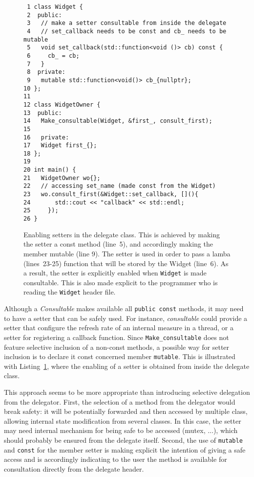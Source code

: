 \documentclass{article}
\begin{document}
\begin{figure}[ht]
{\small
\begin{lstlisting}
 1 class Widget {
 2  public:
 3   // make a setter consultable from inside the delegate 
 4   // set_callback needs to be const and cb_ needs to be mutable
 5   void set_callback(std::function<void ()> cb) const {
 6     cb_ = cb;
 7   }
 8  private:
 9   mutable std::function<void()> cb_{nullptr};
10 };
11 
12 class WidgetOwner {
13  public:
14   Make_consultable(Widget, &first_, consult_first);
15   
16   private:
17   Widget first_{};
18 };
19 
20 int main() {
21   WidgetOwner wo{};
22   // accessing set_name (made const from the Widget)
23   wo.consult_first(&Widget::set_callback, [](){
24       std::cout << "callback" << std::endl;
25     });
26 }
\end{lstlisting}}
\cprotect\caption{Enabling setters in the delegate class. This is achieved by making the setter a const method (line~5), and accordingly making the member mutable (line 9). The setter is used in order to pass a lamba (lines~23-25) function that will be stored by the Widget (line~6). As a result, the setter is explicitly enabled when \verb+Widget+ is made consultable. This is also made explicit to the programmer who is reading the \verb+Widget+ header file.}
\label{example:setters}
\end{figure}

Although a \textit{Consultable} makes available all \verb+public const+ methods, it may need to have a setter that can be safely used. For instance, \textit{consultable} could provide a setter that configure the refresh rate of an internal measure in a thread, or a setter for registering a callback function. Since \verb+Make_consultable+ does not feature selective inclusion of a non-const methods, a possible way for setter inclusion is to declare it const concerned member \verb+mutable+. This is illustrated with Listing~\ref{example:setters}, where the enabling of a setter is obtained from inside the delegate class. 

This approach seems to be more appropriate than introducing selective delegation from the delegator. First, the selection of a method from the delegator would break safety: it will be potentially forwarded and then accessed by multiple class, allowing internal state modification from several classes. In this case, the setter may need internal mechanism for being safe to be accessed (mutex, ...), which should probably be ensured from the delegate itself. Second, the use of \verb+mutable+ and \verb+const+ for the member setter is making explicit the intention of giving a safe access and is accordingly indicating to the user the method is available for consultation directly from the delegate header. 
\end{document}
